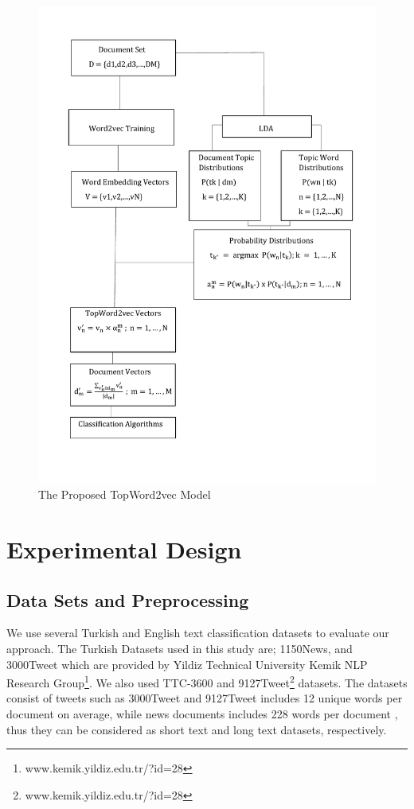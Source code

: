 \documentclass[a4paper,fleqn]{cas-dc}
\begin{document}
\begin{figure}
	\centering
	\includegraphics[scale=.8]{figs/fig6.pdf}
	\caption{The Proposed TopWord2vec Model }
	\label{fig6}
\end{figure}

\section{Experimental Design}


\subsection{Data Sets and Preprocessing}

We use several Turkish and English text classification datasets to evaluate our approach. The Turkish Datasets used in this study are; 1150News, and 3000Tweet which are provided by Yildiz Technical University Kemik NLP Research Group\footnote{www.kemik.yildiz.edu.tr/?id=28}. We also used TTC-3600 \citep{ref18} and 9127Tweet\footnote{www.kemik.yildiz.edu.tr/?id=28}  datasets. The datasets consist of tweets such as 3000Tweet and 9127Tweet includes 12 unique words per document on average, while news documents includes 228 words per document , thus they can be considered as short text and long text datasets, respectively. 
\end{document}
